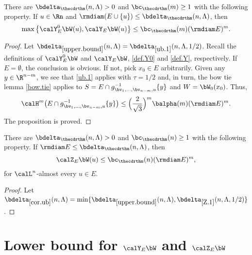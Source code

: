 \begin{Proposition}
\label{upper.bound}
There are $\bdelta_{\thecdrthm}(n,\Lambda) > 0$ and $\bc_{\thecdrthm}(m) \geq 1$ with the following property. If $u \in \Rn$ and $\rmdiam (E \cup \{u\}) \leq \bdelta_{\thecdrthm}(n,\Lambda)$, then
\begin{equation*}
\max \left\{ \calY^0_E \bW(u), \calY_E \bW(u)\right\} \leq \bc_{\thecdrthm}(m) (\rmdiam E)^m.
\end{equation*}
\end{Proposition}

\begin{proof}
Let $\bdelta_{\ref{upper.bound}}(n,\Lambda) =\bdelta_{\ref{ub.1}}(n,\Lambda,1/2)$.
Recall the definitions of $\calY^0_E \bW$ and $\calY_E \bW$, \ref{def.Y0} and \ref{def.Y}, respectively.
If $E =\emptyset$, the conclusion is obvious.
If not, pick $x_0 \in E$ arbitrarily.
Given any $y \in \R^{n-m}$, we see that \ref{ub.1} applies with $\tau = 1/2$ and, in turn, the bow tie lemma \ref{bow.tie} applies to $S = E \cap g_{\bv_1,\ldots,\bv_{n-m},u}^{-1}\{y\}$ and $W = \bW_0(x_0)$.
Thus,
\begin{equation*}
\calH^m \bigl(E \cap g_{\bv_1,\ldots,\bv_{n-m},u}^{-1}\{y\} \bigr) \leq \Bigl(\frac{2}{\sqrt{3}}\Bigr)^m \balpha(m) (\rmdiam E)^m.
\end{equation*}
The proposition is proved.
\end{proof}

\begin{corollary}
\label{cor.ub}
There are $\bdelta_{\thecdrthm}(n,\Lambda) > 0$ and $\bc_{\thecdrthm}(n) \geq 1$ with the following property. If $\rmdiam E \leq \bdelta_{\thecdrthm}(n,\Lambda)$, then
\begin{equation*}
\calZ_E \bW(u) \leq \bc_{\thecdrthm}(n) (\rmdiam E)^m,
\end{equation*}
for $\calL^n$-almost every $u \in E$.
\end{corollary}

\begin{proof}
Let $\bdelta_{\ref{cor.ub}}(n,\Lambda) = \min\{ \bdelta_{\ref{upper.bound}}(n,\Lambda),\bdelta_{\ref{Z.1}}(n,\Lambda,1/2) \}$.
\end{proof}

\section{Lower bound for \texorpdfstring{$\calY_E \bW$ and $\calZ_E \bW$}{YW}}\label{sec:7}

